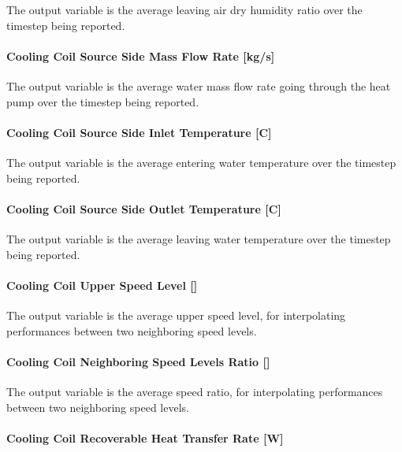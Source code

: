 The output variable is the average leaving air dry humidity ratio over the timestep being reported.

\paragraph{Cooling Coil Source Side Mass Flow Rate {[}kg/s{]}}\label{cooling-coil-source-side-mass-flow-rate-kgs-1}

The output variable is the average water mass flow rate going through the heat pump over the timestep being reported.

\paragraph{Cooling Coil Source Side Inlet Temperature {[}C{]}}\label{cooling-coil-source-side-inlet-temperature-c-1}

The output variable is the average entering water temperature over the timestep being reported.

\paragraph{Cooling Coil Source Side Outlet Temperature {[}C{]}}\label{cooling-coil-source-side-outlet-temperature-c-1}

The output variable is the average leaving water temperature over the timestep being reported.

\paragraph{Cooling Coil Upper Speed Level {[]}}\label{cooling-coil-upper-speed-level-1}

The output variable is the average upper speed level, for interpolating performances between two neighboring speed levels.

\paragraph{Cooling Coil Neighboring Speed Levels Ratio {[]}}\label{cooling-coil-neighboring-speed-levels-ratio-1}

The output variable is the average speed ratio, for interpolating performances between two neighboring speed levels.

\paragraph{Cooling Coil Recoverable Heat Transfer Rate {[}W{]}}\label{cooling-coil-recoverable-heat-transfer-rate-w}

